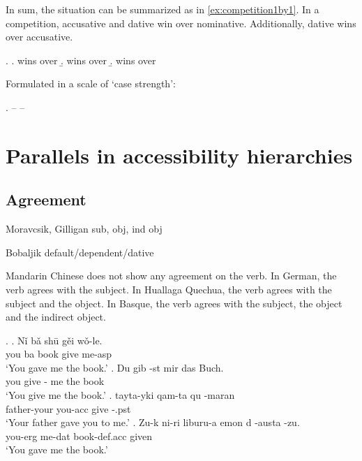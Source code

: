 In sum, the situation can be summarized as in \ref{ex:competition1by1}. In a competition, accusative and dative win over nominative. Additionally, dative wins over accusative.

\ex.\label{ex:competition1by1}
\a.  wins over 
\b.  wins over 
\b.  wins over 

Formulated in a scale of `case strength':

\ex.  --  -- \label{ex:casestrength}




\section{Parallels in accessibility hierarchies}



\subsection{Agreement}

Moravcsik, Gilligan sub, obj, ind obj

Bobaljik default/dependent/dative

Mandarin Chinese does not show any agreement on the verb. In German, the verb agrees with the subject. In Huallaga Quechua, the verb agrees with the subject and the object. In Basque, the verb agrees with the subject, the object and the indirect object.


\ex.
\ag. Nǐ bǎ shū gěi wǒ-le.\\
 you ba book give me-\ac{asp}\\
 `You gave me the book.' 
\bg. Du gib -st mir das Buch.\\
 you give - me the book\\
 `You give me the book.' 
\bg. tayta-yki qam-ta qu -maran\\
 father-your you-\ac{acc} give -.\ac{pst}\\
 `Your father gave you to me.' 
\bg. Zu-k ni-ri liburu-a emon d -austa -zu.\\
 you-\ac{erg} me-\ac{dat} book-\ac{def}.\ac{acc} given   \\
 `You gave me the book.' 

